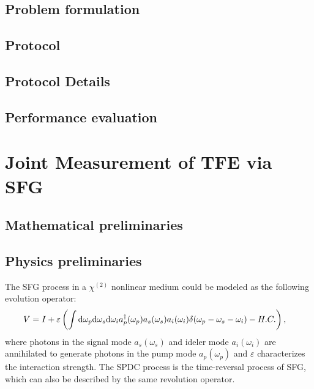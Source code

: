 \documentclass[../../note.tex]{subfiles}
\begin{document}
\subsection{Problem formulation}

\subsection{Protocol}

\subsection{Protocol Details}


\subsection{Performance evaluation}

\section{Joint Measurement of TFE via SFG \cite{liu2020joint}}
\subsection{Mathematical preliminaries}
\begin{proposition}
    
\end{proposition}

\subsection{Physics preliminaries}
\begin{definition}
The SFG process in a $\chi^{(2)}$ nonlinear medium could be modeled as the following evolution operator:
\begin{align}
    \label{evolution operator of sfg process}
    V
    &= I + \varepsilon\left(\int {\rm d}\omega_p {\rm d}\omega_s{\rm d}\omega_i a_p^\dagger(\omega_p)a_s(\omega_s)a_i(\omega_i)\delta(\omega_p - \omega_s - \omega_i) - H.C. \right),
\end{align}
where photons in the signal mode $a_s(\omega_s)$ and ideler mode $a_i(\omega_i)$ are annihilated to generate photons in the pump mode $a_p(\omega_p)$ and $\varepsilon$ characterizes the interaction strength. The SPDC process is the time-reversal process of SFG, which can also be described by the same revolution operator.
\end{definition}
\end{document}
